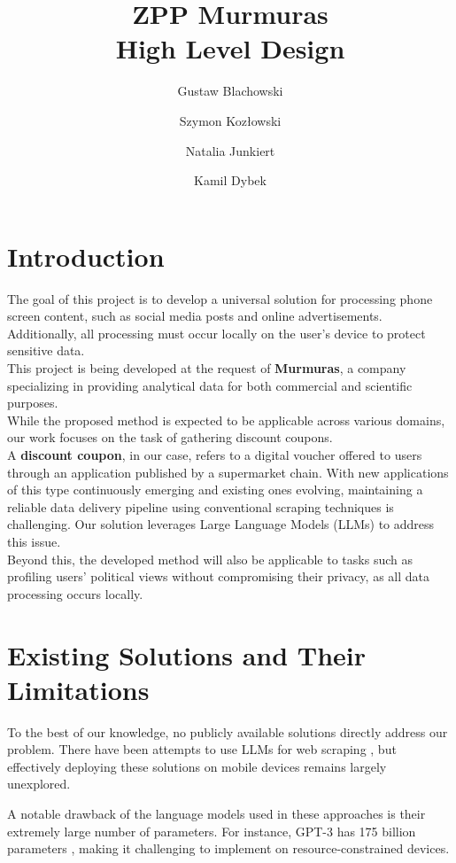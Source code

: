 \documentclass[12pt]{article}
\title{ZPP Murmuras\\ High Level Design}
\author{Gustaw Blachowski \and Szymon Kozłowski \and Natalia Junkiert \and Kamil Dybek}
\date{}
\begin{document}
\maketitle

\section*{Introduction}
The goal of this project is to develop a universal solution for processing phone screen content, such as social media posts and online advertisements. Additionally, all processing must occur locally on the user's device to protect sensitive data.\\

This project is being developed at the request of \textbf{Murmuras}, a company specializing in providing analytical data for both commercial and scientific purposes.\\

While the proposed method is expected to be applicable across various domains, our work focuses on the task of gathering discount coupons.\\

A \textbf{discount coupon}, in our case, refers to a digital voucher offered to users through an application published by a supermarket chain. With new applications of this type continuously emerging and existing ones evolving, maintaining a reliable data delivery pipeline using conventional scraping techniques is challenging. Our solution leverages Large Language Models (LLMs) to address this issue.\\

Beyond this, the developed method will also be applicable to tasks such as profiling users' political views without compromising their privacy, as all data processing occurs locally.


\section*{Existing Solutions and Their Limitations}
To the best of our knowledge, no publicly available solutions directly address our problem. There have been attempts to use LLMs for web scraping \cite{scrapegraph-ai}\cite{llm-reader}, but effectively deploying these solutions on mobile devices remains largely unexplored.

A notable drawback of the language models used in these approaches is their extremely large number of parameters. For instance, GPT-3 has 175 billion parameters \cite{brown2020languagemodelsfewshotlearners}, making it challenging to implement on resource-constrained devices.
\end{document}

